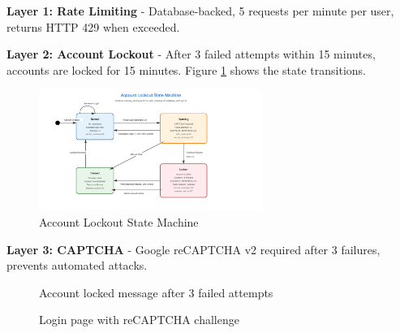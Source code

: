 \documentclass[12pt,a4paper]{article}
\begin{document}
\textbf{Layer 1: Rate Limiting} - Database-backed, 5 requests per minute per user, returns HTTP 429 when exceeded.

\textbf{Layer 2: Account Lockout} - After 3 failed attempts within 15 minutes, accounts are locked for 15 minutes. Figure \ref{fig:lockout_state} shows the state transitions.

\begin{figure}[H]
    \centering
    \includegraphics[width=0.65\textwidth]{diagrams/13_account_lockout_state_machine.png}
    \caption{Account Lockout State Machine}
    \label{fig:lockout_state}
\end{figure}

\textbf{Layer 3: CAPTCHA} - Google reCAPTCHA v2 required after 3 failures, prevents automated attacks.

\begin{figure}[H]
    \centering
    \caption{Account locked message after 3 failed attempts}
    \label{fig:lockout_screen}
\end{figure}

\begin{figure}[H]
    \centering
    \caption{Login page with reCAPTCHA challenge}
    \label{fig:captcha}
\end{figure}
\end{document}
